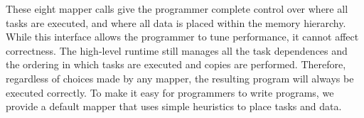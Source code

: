 




These eight mapper calls give the programmer complete control over where all tasks are executed, and
where all data is placed within the memory hierarchy.  While this interface allows the programmer
to tune performance, it cannot affect correctness.  The high-level runtime still manages all the task dependences and the
ordering in which tasks are executed and copies are performed.  Therefore, regardless of choices
made by any mapper, the resulting program will always be executed correctly.
To make it easy for programmers to write programs, we provide a default
 mapper that uses simple heuristics to place tasks and data.  


